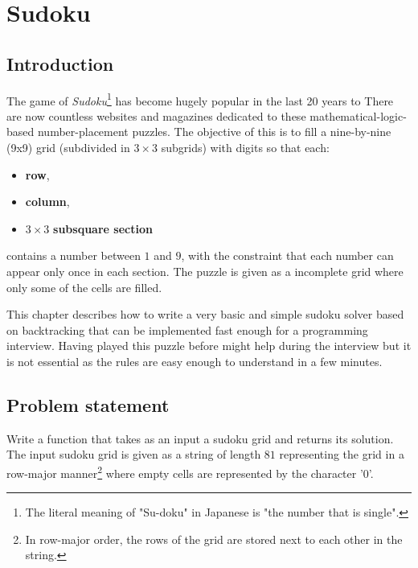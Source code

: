%

\chapter{Sudoku}
\label{ch:sudoku}
\section*{Introduction}
The game of \textit{Sudoku}\footnote{The literal meaning of "Su-doku" in Japanese is "the number
that is single".} has become hugely popular in the last 20 years to There are now countless websites and magazines dedicated to these mathematical-logic-based
number-placement puzzles.  The objective of this is to fill a nine-by-nine (9x9) grid (subdivided in
$3\times3$ subgrids) with digits so that each:
\begin{itemize}[]
	\item \textbf{row},
	\item \textbf{column},
	\item $3\times3$ \textbf{subsquare section}
\end{itemize}
contains a number between $1$ and $9$, with the constraint that each number can appear only once in
each section. The puzzle is given as a incomplete grid where only some of the cells are filled.

This chapter describes how to write a very basic and simple sudoku solver based on backtracking that
can be implemented fast enough for a programming interview. Having played this puzzle before
might help during the interview but it is not essential as the rules are easy enough to
understand in a few minutes.


\section{Problem statement}
\begin{exercise}
Write a function that takes as an input a sudoku grid and returns its solution. The input sudoku
grid is given as a string of length $81$ representing the grid in a row-major manner\footnote{In
row-major order, the rows of the grid are stored next to each other in the string.} where empty
cells are represented by the character '0'.
\end{exercise}



